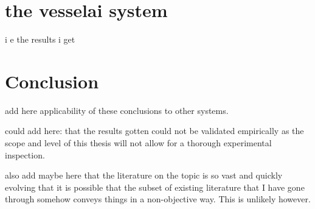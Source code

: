 \chapter{the vesselai system}

i e the results i get

\chapter{Conclusion}

add here applicability of these conclusions to other systems.

could add here: that the results gotten could not be validated empirically as the scope and level of this thesis will not allow for a thorough experimental inspection.

also add maybe here that the literature on the topic is so vast and quickly evolving that it is possible that the subset of existing literature that I have gone through somehow conveys things in a non-objective way. This is unlikely however.
